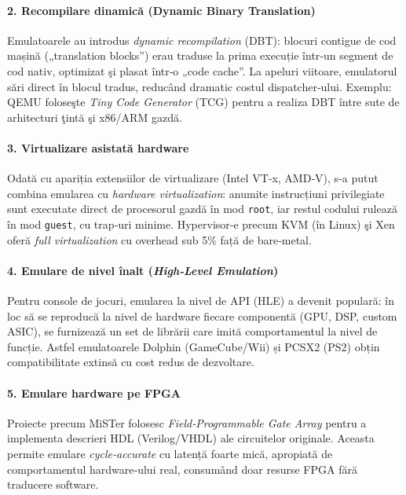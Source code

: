 \documentclass[titlepage,12pt]{article}
\begin{document}
\paragraph{2. Recompilare dinamică (Dynamic Binary Translation)}
Emulatoarele au introdus \emph{dynamic recompilation} (DBT): blocuri contigue de cod mașină („translation blocks”) erau traduse la prima execuție într‑un segment de cod nativ, optimizat şi plasat într‑o „code cache”. La apeluri viitoare, emulatorul sări direct în blocul tradus, reducând dramatic costul dispatcher‑ului. Exemplu: QEMU foloseşte \emph{Tiny Code Generator} (TCG) pentru a realiza DBT între sute de arhitecturi ţintă şi x86/\-ARM gazdă.

\paragraph{3. Virtualizare asistată hardware}
Odată cu apariția extensiilor de virtualizare (Intel VT‑x, AMD‑V), s‑a putut combina emularea cu \emph{hardware virtualization}: anumite instrucțiuni privilegiate sunt executate direct de procesorul gazdă în mod \texttt{root}, iar restul codului rulează în mod \texttt{guest}, cu trap‑uri minime. Hypervisor‑e precum KVM (în Linux) şi Xen oferă \emph{full virtualization} cu overhead sub 5\% față de bare‑metal.

\paragraph{4. Emulare de nivel înalt (\emph{High‑Level Emulation})}
Pentru console de jocuri, emularea la nivel de API (HLE) a devenit populară: în loc să se reproducă la nivel de hardware fiecare componentă (GPU, DSP, custom ASIC), se furnizează un set de librării care imită comportamentul la nivel de funcție. Astfel emulatoarele Dolphin (GameCube/Wii) și PCSX2 (PS2) obțin compatibilitate extinsă cu cost redus de dezvoltare.

\paragraph{5. Emulare hardware pe FPGA}
Proiecte precum MiSTer folosesc \emph{Field‑Programmable Gate Array} pentru a implementa descrieri HDL (Verilog/VHDL) ale circuitelor originale. Aceasta permite emulare \emph{cycle‑accurate} cu latență foarte mică, apropiată de comportamentul hardware‑ului real, consumând doar resurse FPGA fără traducere software.
\end{document}
